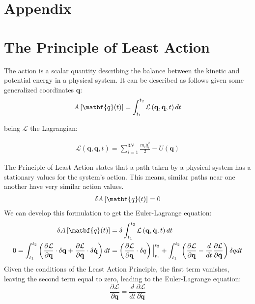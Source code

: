 \documentclass[draft]{agujournal2019}
\begin{document}
\section{Appendix}
\appendix
\section{The Principle of Least Action}
\begin{definition}
    The action is a scalar quantity describing the balance between the kinetic and potential energy in a physical system. It can be described as follows given some generalized coordinates $\mathbf{q}$:
    \begin{align}
        A\left[ \matbf{q}(t) \right] = \int_{t_1}^{t_2} \mathcal{L}\left(\mathbf{q}, \dot{\mathbf{q}}, t\right) dt
    \end{align}
\end{definition}

being $\mathcal{L}$ the Lagrangian:

\begin{align}
    \mathcal{L} \left(\mathbf{q}, \dot{\mathbf{q}}, t \right) = \sum_{i = 1}^{3N} \frac{m_i \dot{q}_i^2}{2} - U(\mathbf{q})
\end{align}

\begin{definition}
    The Principle of Least Action states that a path taken by a physical system has a stationary values for the system's action. This means, similar paths near one another have very similar action values.
    \begin{align}
        \delta A\left[ \matbf{q}(t) \right] = 0
    \end{align}
    We can develop this formulation to get the Euler-Lagrange equation:
    \begin{align}
        \delta A\left[ \matbf{q}(t) \right] &= \delta \int_{t_1}^{t_2} \mathcal{L}\left(\mathbf{q}, \dot{\mathbf{q}}, t\right) dt \\
        0 = \int_{t_1}^{t_2} \left( \frac{\partial \mathcal{L}}{\partial \mathbf{q}} \cdot \delta \mathbf{q} + \frac{\partial \mathcal{L}}{\partial \dot{\mathbf{q}}} \cdot \delta \dot{\mathbf{q}} \right)dt &= \left( \frac{\partial \mathcal{L}}{\partial \mathbf{q}} \cdot \delta q \right) \Big|_{t_1}^{t_2} + \int_{t_1}^{t_2} \left( \frac{\partial \mathcal{L}}{\partial \mathbf{q}} - \frac{d}{dt} \frac{\partial \mathcal{L}}{\partial \dot{\mathbf{q}}}  \right) \delta q dt
    \end{align}
    Given the conditions of the Least Action Principle, the first term vanishes, leaving the second term equal to zero, leading to the Euler-Lagrange equation:
    \begin{equation}
        \frac{\partial \mathcal{L}}{\partial \mathbf{q}} = \frac{d}{dt} \frac{\partial \mathcal{L}}{\partial \dot{\mathbf{q}}}
    \end{equation}
\end{definition}
\end{document}
